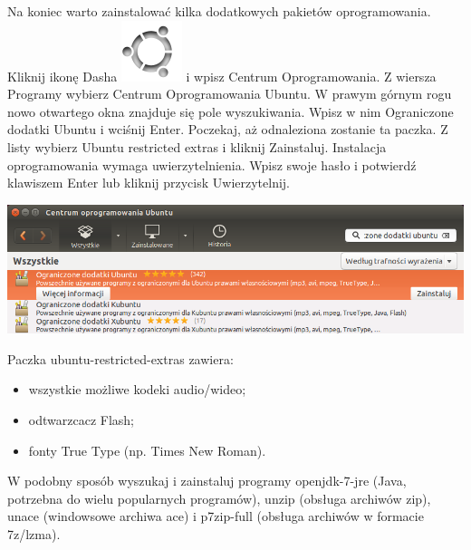 Na koniec warto zainstalować kilka dodatkowych pakietów oprogramowania. Kliknij ikonę Dasha \includegraphics[scale=0.35]{images/ikony_dash.png} i wpisz \textcolor{ubuntu_orange}{Centrum Oprogramowania}. Z wiersza \textcolor{ubuntu_orange}{Programy} wybierz \textcolor{ubuntu_orange}{Centrum Oprogramowania Ubuntu}. W prawym górnym rogu nowo otwartego okna znajduje się pole wyszukiwania. Wpisz w nim \textcolor{ubuntu_orange}{Ograniczone dodatki Ubuntu} i wciśnij Enter. Poczekaj, aż odnaleziona zostanie ta paczka. Z listy wybierz \textcolor{ubuntu_orange}{Ubuntu restricted extras} i kliknij \textcolor{ubuntu_orange}{Zainstaluj}. Instalacja oprogramowania wymaga uwierzytelnienia. Wpisz swoje hasło i potwierdź klawiszem Enter lub kliknij przycisk \textcolor{ubuntu_orange}{Uwierzytelnij}.
\begin{center}
	\includegraphics[width=\linewidth]{images/pierwsze_uruchomienie_dodatki2.png}
\end{center}

Paczka \textcolor{ubuntu_orange}{ubuntu-restricted-extras} zawiera:
\begin{itemize}
\item wszystkie możliwe kodeki audio/wideo;
\item odtwarzcacz Flash;
\item fonty True Type (np. Times New Roman).
\end{itemize}
W podobny sposób wyszukaj i zainstaluj programy \textcolor{ubuntu_orange}{openjdk-7-jre} (Java, potrzebna do wielu popularnych programów), \textcolor{ubuntu_orange}{unzip} (obsługa archiwów zip), \textcolor{ubuntu_orange}{unace} (windowsowe archiwa ace) i \textcolor{ubuntu_orange}{p7zip-full} (obsługa archiwów w formacie 7z/lzma).
\clearpage

